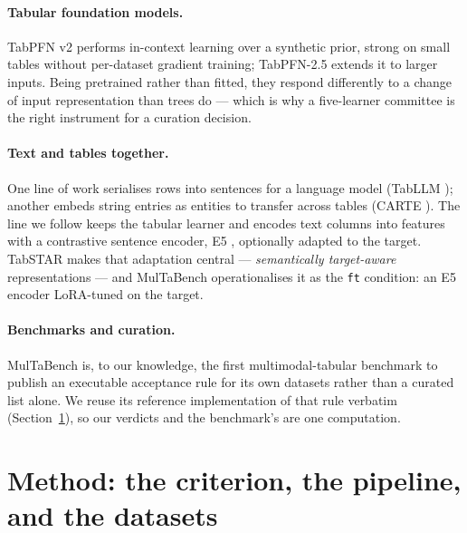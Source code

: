 \documentclass[10pt,letterpaper]{article}
\begin{document}
\paragraph{Tabular foundation models.} TabPFN v2 \cite{tabpfnv2} performs in-context learning
over a synthetic prior, strong on small tables without per-dataset gradient training;
TabPFN-2.5 \cite{tabpfn25} extends it to larger inputs. Being pretrained rather than fitted,
they respond differently to a change of input representation than trees do --- which is why a
five-learner committee is the right instrument for a curation decision.

\paragraph{Text and tables together.} One line of work serialises rows into sentences for a
language model (TabLLM \cite{tabllm}); another embeds string entries as entities to transfer
across tables (CARTE \cite{carte}). The line we follow keeps the tabular learner and encodes
text columns into features with a contrastive sentence encoder, E5 \cite{e5}, optionally
adapted to the target. TabSTAR \cite{tabstar} makes that adaptation central ---
\emph{semantically target-aware} representations --- and MulTaBench operationalises it as the
\texttt{ft} condition: an E5 encoder LoRA-tuned \cite{lora} on the target.

\paragraph{Benchmarks and curation.} MulTaBench \cite{multabench} is, to our knowledge, the
first multimodal-tabular benchmark to publish an executable acceptance rule for its own
datasets rather than a curated list alone. We reuse its reference implementation of that rule
verbatim (Section~\ref{sec:method}), so our verdicts and the benchmark's are one computation.

\section{Method: the criterion, the pipeline, and the datasets}
\label{sec:method}
\end{document}
